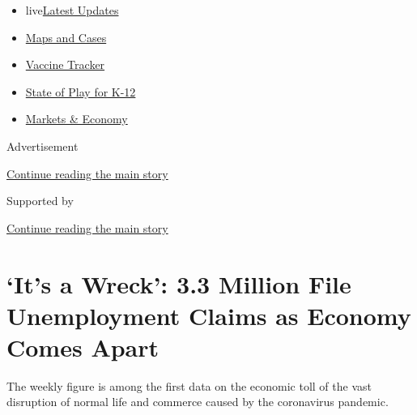 \begin{itemize}
\tightlist
\item
  live\href{https://www.nytimes.com/2020/08/17/world/coronavirus-covid.html?name=styln-coronavirus-markets\&region=TOP_BANNER\&variant=undefined\&block=storyline_menu_recirc\&action=click\&pgtype=Article\&impression_id=10d629c0-e0fd-11ea-9543-ff538f7d3baa}{Latest
  Updates}
\item
  \href{https://www.nytimes.com/interactive/2020/us/coronavirus-us-cases.html?name=styln-coronavirus-markets\&region=TOP_BANNER\&variant=undefined\&block=storyline_menu_recirc\&action=click\&pgtype=Article\&impression_id=10d629c1-e0fd-11ea-9543-ff538f7d3baa}{Maps
  and Cases}
\item
  \href{https://www.nytimes.com/interactive/2020/science/coronavirus-vaccine-tracker.html?name=styln-coronavirus-markets\&region=TOP_BANNER\&variant=undefined\&block=storyline_menu_recirc\&action=click\&pgtype=Article\&impression_id=10d629c2-e0fd-11ea-9543-ff538f7d3baa}{Vaccine
  Tracker}
\item
  \href{https://www.nytimes.com/2020/08/17/us/k-12-schools-reopening.html?name=styln-coronavirus-markets\&region=TOP_BANNER\&variant=undefined\&block=storyline_menu_recirc\&action=click\&pgtype=Article\&impression_id=10d629c3-e0fd-11ea-9543-ff538f7d3baa}{State
  of Play for K-12}
\item
  \href{https://www.nytimes.com/live/2020/08/17/business/stock-market-today-coronavirus?name=styln-coronavirus-markets\&region=TOP_BANNER\&variant=undefined\&block=storyline_menu_recirc\&action=click\&pgtype=Article\&impression_id=10d650d0-e0fd-11ea-9543-ff538f7d3baa}{Markets
  \& Economy}
\end{itemize}

Advertisement

\protect\hyperlink{after-top}{Continue reading the main story}

Supported by

\protect\hyperlink{after-sponsor}{Continue reading the main story}

\hypertarget{its-a-wreck-33-million-file-unemployment-claims-as-economy-comes-apart}{%
\section{`It's a Wreck': 3.3 Million File Unemployment Claims as Economy
Comes
Apart}\label{its-a-wreck-33-million-file-unemployment-claims-as-economy-comes-apart}}

The weekly figure is among the first data on the economic toll of the
vast disruption of normal life and commerce caused by the coronavirus
pandemic.

